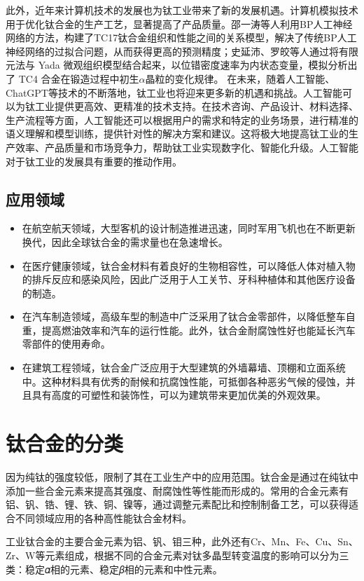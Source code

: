 此外，近年来计算机技术的发展也为钛工业带来了新的发展机遇。计算机模拟技术用于优化钛合金的生产工艺，显著提高了产品质量。邵一涛等人利用BP人工神经网络的方法，构建了TC17钛合金组织和性能之间的关系模型，解决了传统BP人工神经网络的过拟合问题，从而获得更高的预测精度\cite{BP}；史延沛、罗皎等\cite{Moni}人通过将有限元法与 Yada 微观组织模型结合起来，以位错密度速率为内状态变量，模拟分析出了 TC4 合金在锻造过程中初生$\alpha$晶粒的变化规律。
在未来，随着人工智能、ChatGPT等技术的不断落地，钛工业也将迎来更多新的机遇和挑战。人工智能可以为钛工业提供更高效、更精准的技术支持。在技术咨询、产品设计、材料选择、生产流程等方面，人工智能还可以根据用户的需求和特定的业务场景，进行精准的语义理解和模型训练，提供针对性的解决方案和建议。这将极大地提高钛工业的生产效率、产品质量和市场竞争力，帮助钛工业实现数字化、智能化升级。人工智能对于钛工业的发展具有重要的推动作用。
\subsection{应用领域}

\begin{itemize}
\item  在航空航天领域，大型客机的设计制造推进迅速，同时军用飞机也在不断更新换代，因此全球钛合金的需求量也在急速增长。
\item  在医疗健康领域，钛合金材料有着良好的生物相容性，可以降低人体对植入物的排斥反应和感染风险，因此广泛用于人工关节、牙科种植体和其他医疗设备的制造。
\item  在汽车制造领域，高级车型的制造中广泛采用了钛合金零部件，以降低整车自重，提高燃油效率和汽车的运行性能。此外，钛合金耐腐蚀性好也能延长汽车零部件的使用寿命。
\item  在建筑工程领域，钛合金广泛应用于大型建筑的外墙幕墙、顶棚和立面系统中。这种材料具有优秀的耐候和抗腐蚀性能，可抵御各种恶劣气候的侵蚀，并且具有高度的可塑性和装饰性，可以为建筑带来更加优美的外观效果。

\end{itemize}
\section{钛合金的分类}
\label{sec:1.1}
因为纯钛的强度较低，限制了其在工业生产中的应用范围。钛合金是通过在纯钛中添加一些合金元素来提高其强度、耐腐蚀性等性能而形成的。常用的合金元素有铝、钒、锆、锂、铁、铜、镍等，通过调整元素配比和控制制备工艺，可以获得适合不同领域应用的各种高性能钛合金材料。

工业钛合金的主要合金元素为铝、钒、钼三种，此外还有Cr、Mn、Fe、Cu、Sn、Zr、W等元素组成，根据不同的合金元素对钛多晶型转变温度的影响可以分为三类：稳定𝛼相的元素、稳定𝛽相的元素和中性元素。

